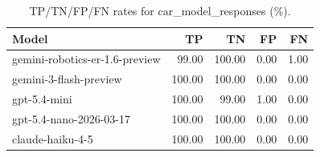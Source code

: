 \begin{table}
\caption{TP/TN/FP/FN rates for car_model_responses (\%).}
\label{tab:car_model_responses_model_rates}
\begin{tabular}{lrrrr}
\toprule
Model & TP & TN & FP & FN \\
\midrule
gemini-robotics-er-1.6-preview & 99.00 & 100.00 & 0.00 & 1.00 \\
gemini-3-flash-preview & 100.00 & 100.00 & 0.00 & 0.00 \\
gpt-5.4-mini & 100.00 & 99.00 & 1.00 & 0.00 \\
gpt-5.4-nano-2026-03-17 & 100.00 & 100.00 & 0.00 & 0.00 \\
claude-haiku-4-5 & 100.00 & 100.00 & 0.00 & 0.00 \\
\bottomrule
\end{tabular}
\end{table}
